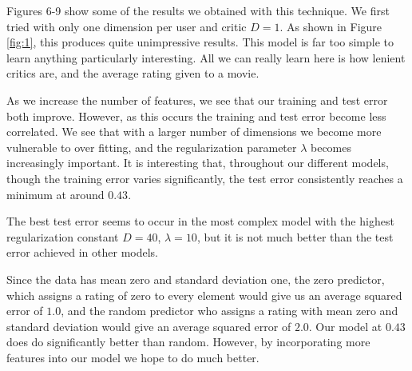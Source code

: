 \documentclass[12pt]{article}
\begin{document}
Figures 6-9 show some of the results we obtained with this technique. We first tried with only one dimension per user and critic $D=1$. As shown in Figure \ref{fig:1}, this produces quite unimpressive results. This model is far too simple to learn anything particularly interesting. All we can really learn here is how lenient critics are, and the average rating given to a movie.

As we increase the number of features, we see that our training and test error both improve. However, as this occurs the training and test error become less correlated. We see that with a larger number of dimensions we become more vulnerable to over fitting, and the regularization parameter $\lambda$ becomes increasingly important. It is interesting that, throughout our different models, though the training error varies significantly, the test error consistently reaches a minimum at around $0.43$. 

The best test error seems to occur in the most complex model with the highest regularization constant $D=40$, $\lambda = 10$, but it is not much better than the test error achieved in other models.

Since the data has mean zero and standard deviation one, the zero predictor, which assigns a rating of zero to every element would give us an average squared error of $1.0$, and the random predictor who assigns a rating with mean zero and standard deviation would give an average squared error of $2.0$. Our model at $0.43$ does do significantly better than random. However, by incorporating more features into our model we hope to do much better.
\end{document}
